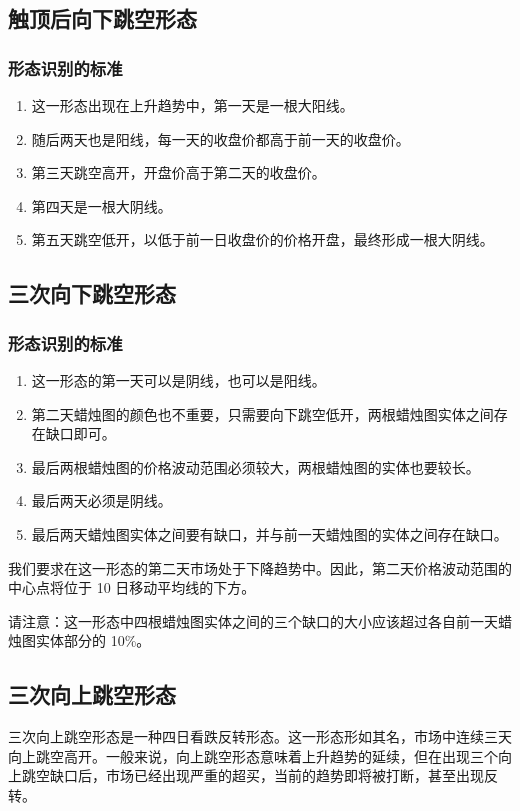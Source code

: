 \subsection{触顶后向下跳空形态}
\subsubsection*{形态识别的标准}
\begin{enumerate}
    \item 这一形态出现在上升趋势中，第一天是一根大阳线。
    \item 随后两天也是阳线，每一天的收盘价都高于前一天的收盘价。
    \item 第三天跳空高开，开盘价高于第二天的收盘价。
    \item 第四天是一根大阴线。
    \item 第五天跳空低开，以低于前一日收盘价的价格开盘，最终形成一根大阴线。
\end{enumerate}
\subsection{三次向下跳空形态}
\subsubsection*{形态识别的标准}
\begin{enumerate}
    \item 这一形态的第一天可以是阴线，也可以是阳线。
    \item 第二天蜡烛图的颜色也不重要，只需要向下跳空低开，两根蜡烛图实体之间存在缺口即可。
    \item 最后两根蜡烛图的价格波动范围必须较大，两根蜡烛图的实体也要较长。
    \item 最后两天必须是阴线。
    \item 最后两天蜡烛图实体之间要有缺口，并与前一天蜡烛图的实体之间存在缺口。
\end{enumerate}

我们要求在这一形态的第二天市场处于下降趋势中。因此，第二天价格波动范围的中心点将位于 10 日移动平均线的下方。

请注意：这一形态中四根蜡烛图实体之间的三个缺口的大小应该超过各自前一天蜡烛图实体部分的 10\%。
\subsection{三次向上跳空形态}
三次向上跳空形态是一种四日看跌反转形态。这一形态形如其名，市场中连续三天向上跳空高开。一般来说，向上跳空形态意味着上升趋势的延续，但在出现三个向上跳空缺口后，市场已经出现严重的超买，当前的趋势即将被打断，甚至出现反转。
